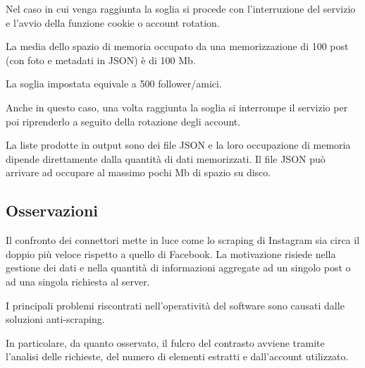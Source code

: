 Nel caso in cui venga raggiunta la soglia si procede con l'interruzione del servizio e l'avvio della funzione cookie o account rotation.

La media dello spazio di memoria occupato da una memorizzazione di 100 post (con foto e metadati in JSON) \`e di 100 Mb.
\begin{center}
\end{center}
La soglia impostata equivale a 500 follower/amici.

Anche in questo caso, una volta raggiunta la soglia si interrompe il servizio per poi riprenderlo a seguito della rotazione degli account.

La liste prodotte in output sono dei file JSON e la loro occupazione di memoria dipende direttamente dalla quantit\`a di dati memorizzati. Il file JSON pu\`o arrivare ad occupare al massimo pochi Mb di spazio su disco.





\subsection{Osservazioni}
Il confronto dei connettori mette in luce come lo scraping di Instagram sia circa il doppio pi\`u veloce rispetto a quello di Facebook.
La motivazione risiede nella gestione dei dati e nella quantit\`a di informazioni aggregate ad un singolo post o ad una singola richiesta al server.

I principali problemi riscontrati nell'operativit\`a del software sono causati dalle soluzioni anti-scraping.

In particolare, da quanto osservato, il fulcro del contrasto avviene tramite l'analisi delle richieste, del numero di elementi estratti e dall'account utilizzato.

